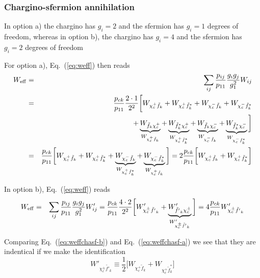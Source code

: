 \documentclass[a4paper,10pt,oneside]{book}
\begin{document}
\subsubsection{Chargino-sfermion annihilation}

In option a) the chargino has $g_i=2$ and the sfermion has $g_i=1$ degrees of freedom, whereas in option b), the chargino has $g_i=4$ and the sfermion has $g_i=2$ degrees of freedom

For option a), Eq.~(\ref{eq:weff}) then reads
\begin{eqnarray}
    W_{\rm eff} & = & \sum_{ij}\frac{p_{ij}}{p_{11}} 
    \frac{g_{i}g_{j}}{g_{1}^2} W_{ij} \nonumber \\
    & = &
    \frac{p_{ck}}{p_{11}} \frac{2 \cdot 1}{2^2}
    \bigg[ 
    W_{\chi_{c}^+ \tilde{f}_{k}} +
    W_{\chi_{c}^+ \tilde{f}_{k}^*} +
    W_{\chi_{c}^- \tilde{f}_{k}} +
    W_{\chi_{c}^- \tilde{f}_{k}^*} \nonumber \\
    & & +
    \underbrace{W_{\tilde{f}_{k} \chi_{c}^+}}_
      {W_{\chi_{c}^+ \tilde{f}_{k}}} +
    \underbrace{W_{\tilde{f}_{k}^* \chi_{c}^+}}_
      {W_{\chi_{c}^+ \tilde{f}_{k}^*}} +
    \underbrace{W_{\tilde{f}_{k} \chi_{c}^-}}_
      {W_{\chi_{c}^- \tilde{f}_{k}}} +
    \underbrace{W_{\tilde{f}_{k}^* \chi_{c}^-}}_
      {W_{\chi_{c}^- \tilde{f}_{k}^*}}
    \bigg] \nonumber \\
    & = &
    \frac{p_{ck}}{p_{11}}
    \bigg[ 
    W_{\chi_{c}^+ \tilde{f}_{k}} +
    W_{\chi_{c}^+ \tilde{f}_{k}^*} +
    \underbrace{W_{\chi_{c}^- \tilde{f}_{k}}}_
      {W_{\chi_{c}^+ \tilde{f}_{k}^*}} +
    \underbrace{W_{\chi_{c}^- \tilde{f}_{k}^*}}_
      {W_{\chi_{c}^+ \tilde{f}_{k}}}
    \bigg]
    = 
    2 \frac{p_{ck}}{p_{11}}
    \bigg[ 
    W_{\chi_{c}^+ \tilde{f}_{k}} +
    W_{\chi_{c}^+ \tilde{f}_{k}^*} \bigg]
    \label{eq:weffchasf-a}
\end{eqnarray}

In option b), Eq.~(\ref{eq:weff}) reads
\begin{eqnarray}
    W_{\rm eff} & = & \sum_{ij}\frac{p_{ij}}{p_{11}} 
    \frac{g_{i}g_{j}}{g_{1}^2} W'_{ij}
    =
    \frac{p_{ck}}{p_{11}} \frac{4 \cdot 2}{2^2}
    \bigg[ 
    W'_{\chi_{c}^\pm \tilde{f'}_{k}} +
    \underbrace{W'_{\tilde{f'}_{k} \chi_{c}^\pm}}_
      {W'_{\chi_{c}^\pm \tilde{f'}_{k}}} \bigg]
    = 4 \frac{p_{ck}}{p_{11}} W'_{\chi_{c}^\pm \tilde{f'}_{k}}
    \label{eq:weffchasf-b}
\end{eqnarray}

Comparing Eq.~(\ref{eq:weffchasf-b}) and Eq.~(\ref{eq:weffchasf-a}) we 
see that they are indentical if we make the identification
\begin{equation}
    W'_{\chi_{c}^\pm \tilde{f'}_{k}} \equiv
    \frac{1}{2} \bigg[ 
    W_{\chi_{c}^+ \tilde{f}_{k}} + 
    W_{\chi_{c}^+ \tilde{f}_{k}^*}
    \bigg] 
\end{equation}
\end{document}
